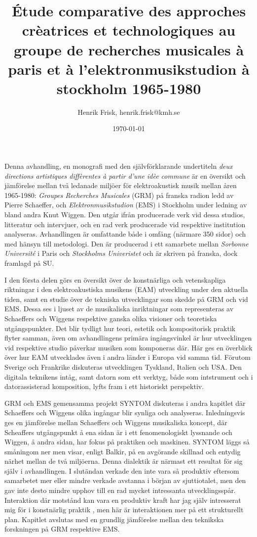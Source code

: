 \documentclass[11pt]{article}
\author{Henrik Frisk, henrik.frisk@kmh.se}
\date{\today}
\title{Étude comparative des approches crèatrices et technologiques au groupe de recherches musicales à paris et à l’elektronmusikstudion à stockholm 1965-1980}
\begin{document}
\UseRawInputEncoding

\maketitle
Denna avhandling, en monografi med den självförklarande undertiteln \emph{deux directions artistiques diffèrentes à partir d’une idèe commune} är en översikt och jämförelse mellan två ledanade miljöer för elektroakustisk musik mellan åren 1965-1980: \emph{Groupes Recherches Musicales} (GRM) på franska radion ledd av Pierre Schaeffer, och \emph{Elektronmusikstudion} (EMS) i Stockholm under ledning av bland andra Knut Wiggen. Den utgår ifrån producerade verk vid dessa studios, litteratur och intervjuer, och en rad verk producerade vid respektive institution analyseras. Avhandlingen är omfattande både i omfång (närmare 350 sidor) och med hänsyn till metodologi. Den är producerad i ett samarbete mellan \emph{Sorbonne Université} i Paris och \emph{Stockholms Univeristet} och är skriven på franska, dock framlagd på SU.

I den första delen görs en översikt över de konstnärliga och vetenskapliga riktningar i den elektroakustiska musikens (EAM) utveckling under den aktuella tiden, samt en studie över de tekniska utvecklingar som skedde på GRM och vid EMS. Dessa ses i ljuset av de musikaliska inriktningar som representeras av Schaeffers och Wiggens respektive ganska olika visioner och teoretiska utgångspunkter. Det blir tydligt hur teori, estetik och kompositorisk praktik flyter samman, även om avhandlingens primära ingångsvinkel är hur utvecklingen vid respektive studio påverkar musiken som komponeras där. Här ges en överblick över hur EAM utvecklades även i andra länder i Europa vid samma tid. Förutom Sverige och Frankrike diskuteras utvecklingen Tyskland, Italien och USA. Den digitala teknikens intåg, samt datorn som ett verktyg, både som intstrument och i datorassisterad komposition, lyfts fram i ett historiskt perspektiv.

GRM och EMS gemensamma projekt SYNTOM diskuteras i andra kapitlet där Schaeffers och Wiggens olika ingångar blir synliga och analyseras. Inledningsvis ges en jämförelse mellan Schaeffers och Wiggens musikaliska koncept, där Scheaffers utgångspunkt å ena sidan är i ett fenomenologiskt lyssnande och Wiggen, å andra sidan, har fokus på praktiken och maskinen. SYNTOM läggs så småningom ner men visar, enligt Balkir, på en avgörande skillnad och entydig närhet mellan de två miljöerna. Denna dialektik är närmast ett resultat för sig själv i avhandlingen. I slutändan verkade den inte vara så produktiv eftersom samarbetet mer eller mindre verkade avstanna i början av sjuttiotalet, men den gav inte desto mindre upphov till en rad mycket intressanta utvecklingsspår. Interaktion där motstånd kan vara en produktiv kraft har jag själv intresserat mig för i konstnärlig praktik \citep[Inte minst i min avhandling][]{frisk08phd}, men här är interaktionen mer på ett strukturellt plan.
Kapitlet avslutas med en grundlig jämförelse mellan den teknikska forskningen på GRM respektive EMS.
\end{document}
